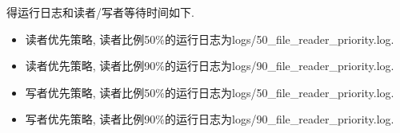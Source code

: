 得运行日志和读者/写者等待时间如下.
\begin{itemize}
    \item 读者优先策略, 读者比例50\%的运行日志为logs/50\_file\_reader\_priority.log.
    \item 读者优先策略, 读者比例90\%的运行日志为logs/90\_file\_reader\_priority.log.
    \item 写者优先策略, 读者比例50\%的运行日志为logs/50\_file\_reader\_priority.log.
    \item 写者优先策略, 读者比例90\%的运行日志为logs/90\_file\_reader\_priority.log.
\end{itemize}